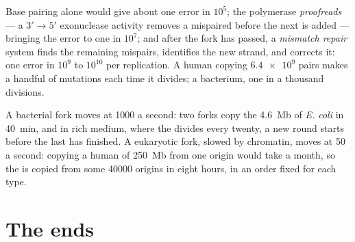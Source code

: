 \begin{proposition}[Fidelity]\label{prop:b1:replication-mitosis:fidelity}
Base pairing alone would give about one error in $10^5$; the
polymerase \emph{proofreads} --- a $3' \to 5'$ exonuclease activity
removes a mispaired  before the next is added --- bringing
the error to one in $10^7$; and after the fork has passed, a
\emph{mismatch repair} system finds the remaining mispairs, identifies
the new strand, and corrects it: one error in $10^9$ to $10^{10}$  per replication. A human  copying $\num{6.4e9}$ pairs makes
a handful of mutations each time it divides; a bacterium, one in a
thousand divisions.
\end{proposition}

\begin{example}\label{ex:b1:replication-mitosis:speed}
A bacterial fork moves at \qty{1000}{}  a second: two forks
copy the \qty{4.6}{Mb} of \emph{E. coli} in \qty{40}{min}, and in rich
medium, where the  divides every twenty, a new round starts before
the last has finished. A eukaryotic fork, slowed by chromatin, moves
at \qty{50}{} a second: copying a human  of \qty{250}{Mb}
from one origin would take a month, so the  is copied from some
\num{40000} origins in eight hours, in an order fixed for each 
type.
\end{example}

\section{The ends}

